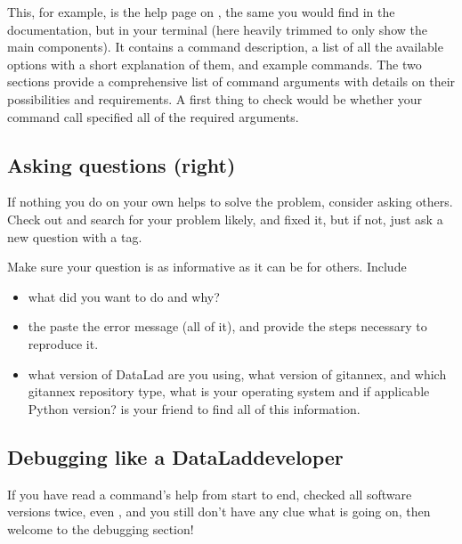 \sphinxAtStartPar
This, for example, is the help page on , the same you would find in the documentation, but in your terminal (here heavily trimmed to only show the main components).
It contains a command description, a list
of all the available options with a short explanation of them, and
example commands. The two  sections provide a comprehensive
list of command arguments with details on their possibilities and
requirements. A first thing to check would be whether your command call
specified all of the required arguments.


\subsection{Asking questions (right)}
\label{\detokenize{basics/101-135-help:asking-questions-right}}
\sphinxAtStartPar
If nothing you do on your own helps to solve the problem,
consider asking others. Check out 
and search for your problem \textendash{} likely,
and fixed it, but if not, just ask a new question with a  tag.

\sphinxAtStartPar
Make sure your question is as informative as it can be for others.
Include
\begin{itemize}
\item {} 
\sphinxAtStartPar
{} \textendash{} what did you want to do and why?

\item {} 
\sphinxAtStartPar
the  \textendash{} paste the error message (all of it), and provide the
steps necessary to reproduce it.

\item {} 
\sphinxAtStartPar
{} \textendash{} what version of DataLad are you using, what version
of git\sphinxhyphen{}annex, and which git\sphinxhyphen{}annex repository type, what is your operating
system and \textendash{} if applicable \textendash{} Python version?  is your friend
to find all of this information.

\end{itemize}

\ignorespaces 

\subsection{Debugging like a DataLad\sphinxhyphen{}developer}
\label{\detokenize{basics/101-135-help:debugging-like-a-datalad-developer}}\label{\detokenize{basics/101-135-help:index-1}}
\sphinxAtStartPar
If you have read a command’s help from start to end, checked all software versions twice, even , and you still don’t have any clue what is going on, then welcome to the debugging section!

